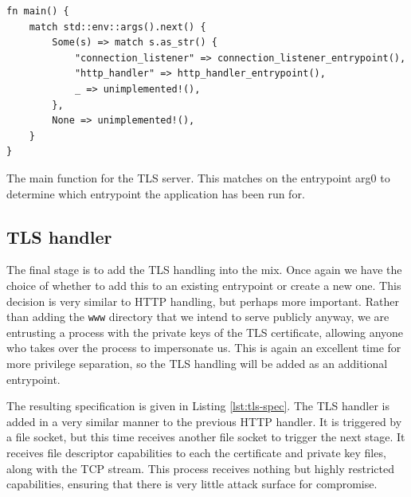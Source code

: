 \documentclass[12pt,a4paper,twoside]{report}
\begin{document}
\begin{listing}
\begin{verbatim}
fn main() {
    match std::env::args().next() {
        Some(s) => match s.as_str() {
            "connection_listener" => connection_listener_entrypoint(),
            "http_handler" => http_handler_entrypoint(),
            _ => unimplemented!(),
        },
        None => unimplemented!(),
    }
}
\end{verbatim}

\caption{The main function for the TLS server. This matches on the entrypoint arg0 to determine which entrypoint the application has been run for.}
\label{lst:tls-main-function}
\end{listing}

\subsection{TLS handler}
\label{sec:building-tls-tls-handler}

The final stage is to add the TLS handling into the mix. Once again we have the choice of whether to add this to an existing entrypoint or create a new one. This decision is very similar to HTTP handling, but perhaps more important. Rather than adding the \texttt{www} directory that we intend to serve publicly anyway, we are entrusting a process with the private keys of the TLS certificate, allowing anyone who takes over the process to impersonate us. This is again an excellent time for more privilege separation, so the TLS handling will be added as an additional entrypoint.

The resulting specification is given in Listing \ref{lst:tls-spec}. The TLS handler is added in a very similar manner to the previous HTTP handler. It is triggered by a file socket, but this time receives another file socket to trigger the next stage. It receives file descriptor capabilities to each the certificate and private key files, along with the TCP stream. This process receives nothing but highly restricted capabilities, ensuring that there is very little attack surface for compromise.
\end{document}
